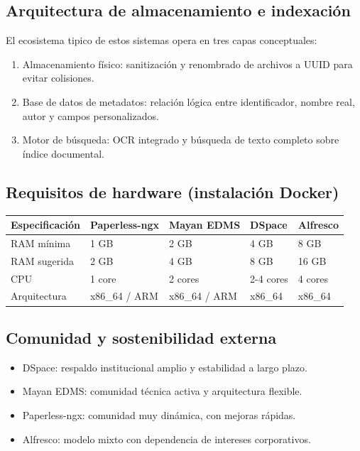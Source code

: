\subsection{Arquitectura de almacenamiento e indexación}
El ecosistema tipico de estos sistemas opera en tres capas conceptuales:

\begin{enumerate}
  \item Almacenamiento físico: sanitización y renombrado de archivos a UUID para evitar colisiones.
  \item Base de datos de metadatos: relación lógica entre identificador, nombre real, autor y campos personalizados.
  \item Motor de búsqueda: OCR integrado y búsqueda de texto completo sobre índice documental.
\end{enumerate}

\subsection{Requisitos de hardware (instalación Docker)}
\begin{longtable}{p{} p{} p{} p{} p{}}
\toprule
\textbf{Especificación} & \textbf{Paperless-ngx} & \textbf{Mayan EDMS} & \textbf{DSpace} & \textbf{Alfresco} \\
\midrule
RAM mínima & 1 GB & 2 GB & 4 GB & 8 GB \\
RAM sugerida & 2 GB & 4 GB & 8 GB & 16 GB \\
CPU & 1 core & 2 cores & 2-4 cores & 4 cores \\
Arquitectura & x86_64 / ARM & x86_64 / ARM & x86_64 & x86_64 \\
\bottomrule
\end{longtable}

\subsection{Comunidad y sostenibilidad externa}
\begin{itemize}
  \item DSpace: respaldo institucional amplio y estabilidad a largo plazo.
  \item Mayan EDMS: comunidad técnica activa y arquitectura flexible.
  \item Paperless-ngx: comunidad muy dinámica, con mejoras rápidas.
  \item Alfresco: modelo mixto con dependencia de intereses corporativos.
\end{itemize}


